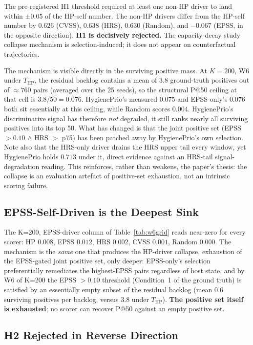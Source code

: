 The pre-registered H1 threshold required at least one non-HP driver to
land within $\pm 0.05$ of the HP-self number. The non-HP drivers
differ from the HP-self number by $0.626$ (CVSS), $0.638$ (HRS),
$0.630$ (Random), and $-0.067$ (EPSS, in the opposite direction).
\textbf{H1 is decisively rejected.} The capacity-decay study collapse mechanism is
selection-induced; it does not appear on counterfactual trajectories.

The mechanism is visible directly in the surviving positive mass. At
$K = 200$, W6 under $T_{\mathrm{HP}}$, the residual backlog contains a
mean of $3.8$ ground-truth positives out of $\approx 760$ pairs
(averaged over the 25 seeds), so the structural P@50 ceiling at that
cell is $3.8 / 50 = 0.076$. HygienePrio's measured $0.075$ and
EPSS-only's $0.076$ both sit essentially at this ceiling, while Random
scores $0.004$. HygienePrio's discriminative signal has therefore
\textit{not} degraded, it still ranks nearly all surviving
positives into its top 50. What has changed is that the joint
positive set (EPSS $> 0.10$ $\wedge$ HRS $>$ p75) has been patched
away by HygienePrio's own selection. Note also that the HRS-only
driver drains the HRS upper tail every window, yet HygienePrio holds
$0.713$ under it, direct evidence against an HRS-tail
signal-degradation reading. This reinforces, rather than weakens, the
paper's thesis: the collapse is an evaluation artefact of positive-set
exhaustion, not an intrinsic scoring failure.

\subsection{EPSS-Self-Driven is the Deepest Sink}

The K=200, EPSS-driver column of Table~\ref{tab:w6grid} reads
near-zero for every scorer: HP $0.008$, EPSS $0.012$, HRS $0.002$,
CVSS $0.001$, Random $0.000$. The mechanism is the \textit{same} one
that produces the HP-driver collapse, exhaustion of the EPSS-gated
joint positive set, only deeper: EPSS-only's selection
preferentially remediates the highest-EPSS pairs regardless of host
state, and by W6 of K=200 the EPSS $> 0.10$ threshold (Condition~1 of
the ground truth) is satisfied by an essentially empty subset of the
residual backlog (mean $0.6$ surviving positives per backlog, versus
$3.8$ under $T_{\mathrm{HP}}$). \textbf{The positive set itself is
exhausted}; no scorer can recover P@50 against an empty positive set.

\subsection{H2 Rejected in Reverse Direction}

